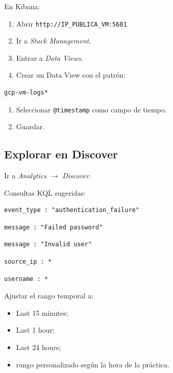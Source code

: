 \documentclass[
  coursetitle={Cómputo Nube y Tecnologías Emergentes},
  coursehours={96},
  coursedate={Verano 2026},
  doctype={Práctica},
  otherlangs={english,french},
  authorname={Lázaro},
  authorsurname={Bustio-Martínez},
  authortitle={PhD},
  role={Profesor Investigador},
  email={lbustio@inaoe.mx},
  phone={5559504000},
  ext={7459},
  institution={Instituto Nacional de Astrofísica, Óptica y Electrónica (INAOE)},
  department={Maestría en Ciencias en Tecnologías de Seguridad},
  address={Luis Enrique Erro 1, Sta. Ma. Tonantzintla, San Andrés Cholula, CP 72840, Puebla, México},
  margin={0.5in}
]{../../lbustio_lecture_notes}
\begin{document}
En Kibana:

\begin{enumerate}
    \item Abrir \texttt{http://IP\_PUBLICA\_VM:5601}.
    \item Ir a \textit{Stack Management}.
    \item Entrar a \textit{Data Views}.
    \item Crear un Data View con el patrón:
\end{enumerate}

\begin{lstlisting}
gcp-vm-logs*
\end{lstlisting}

\begin{enumerate}[resume]
    \item Seleccionar \texttt{@timestamp} como campo de tiempo.
    \item Guardar.
\end{enumerate}

\subsection{Explorar en Discover}

Ir a \textit{Analytics} \(\rightarrow\) \textit{Discover}.

Consultas KQL sugeridas:

\begin{lstlisting}
event_type : "authentication_failure"
\end{lstlisting}

\begin{lstlisting}
message : "Failed password"
\end{lstlisting}

\begin{lstlisting}
message : "Invalid user"
\end{lstlisting}

\begin{lstlisting}
source_ip : *
\end{lstlisting}

\begin{lstlisting}
username : *
\end{lstlisting}

Ajustar el rango temporal a:

\begin{itemize}
    \item Last 15 minutes;
    \item Last 1 hour;
    \item Last 24 hours;
    \item rango personalizado según la hora de la práctica.
\end{itemize}
\end{document}
